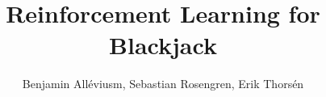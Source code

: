\documentclass{beamer}
\title[Reinforcement Learning]{ Reinforcement Learning for Blackjack} %
\author{Benjamin Alléviusm, Sebastian Rosengren, Erik Thorsén} %
\institute[SU] %
{
Department of Mathematics, Stockholm University
}
\date %
\begin{document}
	
\begin{frame}
	\titlepage %
	\centering
\end{frame}



\end{document}
